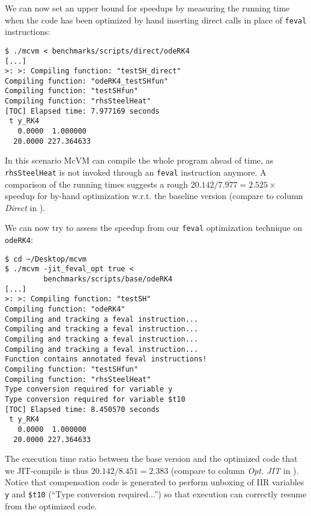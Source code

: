 We can now set an upper bound for speedups by measuring the running time when the code has been optimized by hand inserting direct calls in place of {\tt feval} instructions:

\begin{small}
\begin{verbatim}
$ ./mcvm < benchmarks/scripts/direct/odeRK4
[...]
>: >: Compiling function: "testSH_direct"
Compiling function: "odeRK4_testSHfun"
Compiling function: "testSHfun"
Compiling function: "rhsSteelHeat"
[TOC] Elapsed time: 7.977169 seconds
 t y_RK4
   0.0000  1.000000
  20.0000 227.364633
\end{verbatim}
\end{small}

\noindent In this scenario McVM can compile the whole program ahead of time, as {\tt rhsSteelHeat} is not invoked through an {\tt feval} instruction anymore. A comparison of the running times suggests a rough $20.142/7.977=2.525\times$ speedup for by-hand optimization w.r.t. the baseline version (compare to column {\em Direct} in ).

We can now try to assess the speedup from our {\tt feval} optimization technique on {\tt odeRK4}:

\begin{small}
\begin{verbatim}
$ cd ~/Desktop/mcvm
$ ./mcvm -jit_feval_opt true <
         benchmarks/scripts/base/odeRK4
[...]
>: >: Compiling function: "testSH"
Compiling function: "odeRK4"
Compiling and tracking a feval instruction...
Compiling and tracking a feval instruction...
Compiling and tracking a feval instruction...
Compiling and tracking a feval instruction...
Function contains annotated feval instructions!
Compiling function: "testSHfun"
Compiling function: "rhsSteelHeat"
Type conversion required for variable y
Type conversion required for variable $t10
[TOC] Elapsed time: 8.450570 seconds
 t y_RK4
   0.0000  1.000000
  20.0000 227.364633
\end{verbatim}
\end{small}

\noindent The execution time ratio between the base version and the optimized code that we JIT-compile is thus $20.142/8.451=2.383$ (compare to column {\em Opt. JIT} in ). Notice that compensation code is generated to perform unboxing of IIR variables {\tt y} and {\tt \$t10} (``Type conversion required...'') so that execution can correctly resume from the optimized code.

